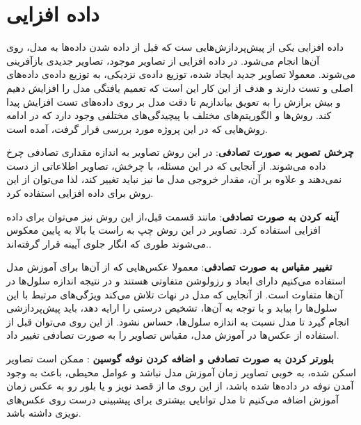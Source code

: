 \section{داده افزایی}\label{subsec:داده-افزایی}

داده افزایی یکی از پیش‌پردازش‌هایی ست که قبل از داده شدن داده‌ها به مدل، روی آن‌ها انجام می‌شود.
در داده افزایی از تصاویر موجود، تصاویر جدیدی بازآفرینی می‌شوند.
معمولا تصاویر جدید ایجاد شده، توزیع داده‌ی نزدیکی، به توزیع داده‌ی داده‌های اصلی و تست دارند و هدف از این کار این است که تعمیم یافتگی مدل را افزایش دهیم و بیش برازش را به تعویق بیاندازیم تا دقت مدل بر روی داده‌های تست افزایش پیدا کند.
روش‌ها و الگوریتم‌های مختلف با پیچیدگی‌های مختلفی وجود دارد که در ادامه روش‌هایی که در این پروژه مورد بررسی قرار گرفت، آمده است.

\textbf{چرخش تصویر به صورت تصادفی}:
در این روش تصاویر به اندازه مقداری تصادفی چرخ داده می‌شوند.
از آنجایی که در این مسئله، با چرخش، تصاویر اطلاعاتی از دست نمی‌دهند و علاوه بر آن، مقدار خروجی مدل ما نیز نباید تغییر کند، لذا می‌توان از این روش برای داده افزایی استفاده کرد.

\textbf{آینه کردن به صورت تصادفی}:
مانند قسمت قبل،از این روش نیز می‌توان برای داده افزایی استفاده کرد. تصاویر در این روش چپ به راست یا بالا به پایین معکوس می‌شوند طوری که انگار جلوی آیینه قرار گرفته‌اند..

\textbf{تغییر مقیاس به صورت تصادفی}:
معمولا عکس‌هایی که از آن‌ها برای آموزش مدل استفاده می‌کنیم دارای ابعاد و رزولوشن متفاوتی هستند و در نتیجه اندازه سلول‌ها در آن‌ها متفاوت است.
از آنجایی که مدل در نهات تلاش می‌کند ویژگی‌های مرتبط با این سلول‌ها را بیابد و با توجه به آن‌ها، تشخیص درستی را ارایه دهد، باید پیش‌پردازشی انجام گیرد تا مدل نسبت به اندازه سلول‌ها، حساس نشود. از این روی می‌توان قبل از استفاده از عکس‌ها در آموزش مدل، مقیاس تصاویر را به صورت تصادفی تغییر داد.

\textbf{بلورتر کردن به صورت تصادفی و اضافه کردن نوفه گوسین }:
ممکن است تصاویر اسکن شده، به خوبی تصاویر زمان آموزش مدل نباشد و عوامل محیطی، باعث به وجود آمدن نوفه در داده‌ها شده باشد، از این روی ما از قصد نویز و یا بلور رو به عکس زمان آموزش اضافه می‌کنیم تا مدل توانایی بیشتری برای پیشبینی درست روی عکس‌های نویزی داشته باشد.

